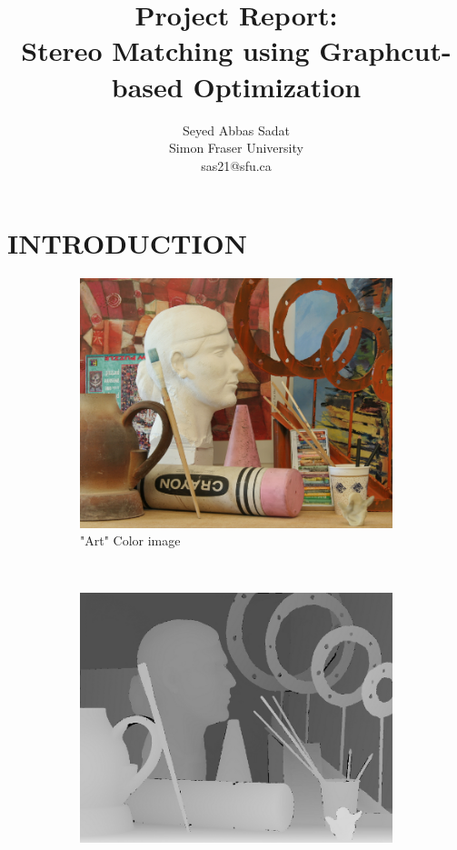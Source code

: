 \documentclass[letterpaper, 10 pt, conference]{ieeeconf}  %
\title{Project Report:\\\LARGE \bf
Stereo Matching using Graphcut-based Optimization}
\author{Seyed Abbas Sadat\\
Simon Fraser University\\
sas21@sfu.ca%
}
\begin{document}
\maketitle
\thispagestyle{empty}
\pagestyle{empty}


\section{INTRODUCTION}

\begin{figure}[t]
        \centering
        \begin{subfigure}[b]{0.3\textwidth}
                \centering
                \includegraphics[width=\textwidth]{imgs/l4.png}
                \caption{"Art" Color image}
                \label{fig:trees}
        \end{subfigure}%
                ~ %
        \begin{subfigure}[b]{0.3\textwidth}
                \centering
                \includegraphics[width=\textwidth]{imgs/disp4.png}

\end{subfigure}
\end{figure}
\end{document}
